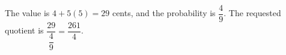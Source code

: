 The value is $4+5(5)=29$ cents, and the probability is $\dfrac{4}{9}$. The requested quotient is $\dfrac{29}{\dfrac{4}{9}}=\boxed{\dfrac{261}{4}}$.
